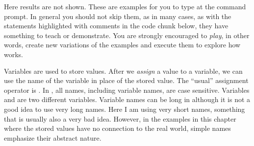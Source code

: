 \documentclass[krantz2]{krantz}\usepackage{knitr}
\begin{document}
\begin{playground}
Here results are not shown. These are examples for you to type at the command prompt. In general you should not skip them, as in many cases, as with the statements highlighted with comments in the code chunk below, they have something to teach or demonstrate. You are strongly encouraged to \emph{play}, in other words, create new variations of the examples and execute them to explore how \Rlang works.

\begin{knitrout}\footnotesize
{}\color{fgcolor}\begin{kframe}
\begin{alltt}
 \hlopt{+} 
 \hlopt{*} 
 \hlopt{+}  \hlopt{/} 
\hlstd{(} \hlopt{+} \hlstd{)} \hlopt{/} 
\hlopt{^} \hlopt{+} 
\hlstd{(}\hlstd{)}
 
  \hlstd{=} \hlstd{)}
 
\hlstd{(}\hlstd{)}
\hlstd{(}\hlstd{)}
\hlstd{(}\hlstd{)}
\hlstd{(}\hlstd{)}
\end{alltt}
\end{kframe}
\end{knitrout}

\end{playground}

Variables are used to store values. After we \emph{assign} a value to a variable, we can use the name of the variable in place of the stored value. The ``usual'' assignment operator is \Roperator{<-}. In \Rlang, all names, including variable names, are case sensitive. Variables  and  are two different variables. Variable names can be long in \Rlang although it is not a good idea to use very long names. Here I am using very short names, something that is usually also a very bad idea. However, in the examples in this chapter where the stored values have no connection to the real world, simple names emphasize their abstract nature.
\end{document}
